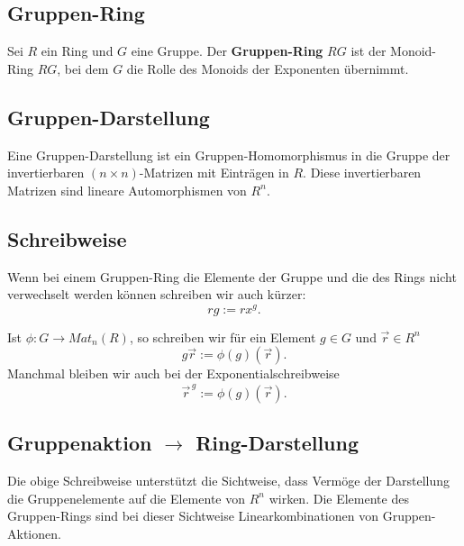 \documentclass[a4paper]{amsart}
\theoremstyle{definition}
\begin{document}
\subsection{Gruppen-Ring}
Sei $R$ ein Ring und $G$ eine Gruppe. Der \textbf{Gruppen-Ring} $RG$ ist der Monoid-Ring $RG$, bei dem $G$ die Rolle des Monoids der Exponenten übernimmt.

\subsection{Gruppen-Darstellung}
Eine Gruppen-Darstellung ist ein Gruppen-Homomorphismus in die Gruppe der invertierbaren  $(n \times n)$-Matrizen mit Einträgen in $R$. Diese invertierbaren Matrizen sind lineare Automorphismen von $R^n$.

\subsection{Schreibweise}
Wenn bei einem Gruppen-Ring die Elemente der Gruppe und die des Rings nicht verwechselt werden können schreiben wir auch kürzer:
\begin{equation}\label{multiplyByRing}
   rg := rx^g.
\end{equation}

Ist $\phi \colon G \to Mat_n(R)$, so schreiben wir für ein Element \( g \in G \) und \( \vec r \in R^n \)
\begin{equation}\label{gvruppeAlsMal}
   g \vec r := \phi(g)(\vec r).
\end{equation}
Manchmal bleiben wir auch bei der Exponentialschreibweise
\begin{equation}\label{gruppeAlsHoch}
   \vec r^{\,g} := \phi(g)(\vec r).
\end{equation}

\subsection{Gruppenaktion \( \rightarrow \) Ring-Darstellung}
Die obige Schreibweise unterstützt die Sichtweise, dass Vermöge der Darstellung die Gruppenelemente auf die Elemente von \( R^n \) wirken. Die Elemente des Gruppen-Rings sind bei dieser Sichtweise Linearkombinationen von Gruppen-Aktionen.
\end{document}
